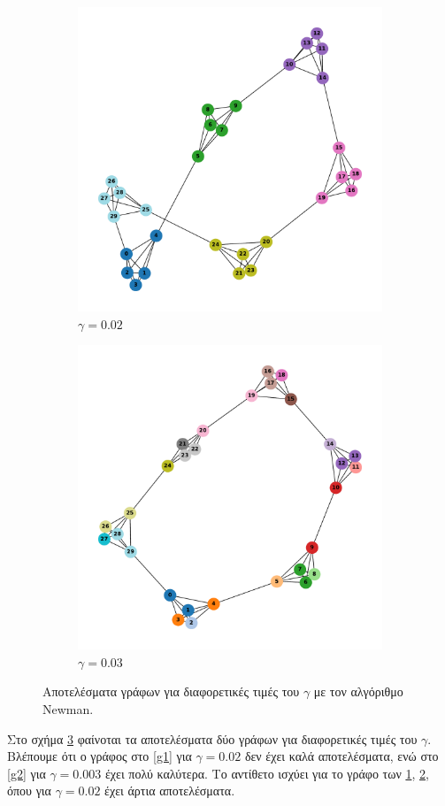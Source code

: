 \documentclass[12pt, letterpaper]{article}
\begin{document}
\begin{figure}
  \begin{subfigure}{0.5\textwidth}
    \centering
    \includegraphics[width=0.6\linewidth]{gammachange6,5gamma=0.02.pdf}
    \caption{$\gamma = 0.02$}
    \label{g3}
  \end{subfigure}
  \begin{subfigure}{0.5\textwidth}
    \centering
    \includegraphics[width=0.6\linewidth]{gammachange6,5gamma=0.04.pdf}
    \caption{$\gamma = 0.03$}
    \label{g4}
  \end{subfigure}


  \caption{Αποτελέσματα γράφων για διαφορετικές τιμές του $\gamma$
  με τον αλγόριθμο \textlatin{Newman}.}
  \label{gamma_tests}
\end{figure}




Στο σχήμα \ref{gamma_tests} φαίνοται τα αποτελέσματα δύο γράφων για διαφορετικές τιμές
του $\gamma$. Βλέπουμε ότι ο γράφος στο \ref{g1} για $\gamma = 0.02$ δεν έχει καλά 
αποτελέσματα, ενώ στο \ref{g2} για $\gamma = 0.003$ έχει πολύ καλύτερα. Το αντίθετο 
ισχύει για το γράφο των \ref{g3}, \ref{g4}, όπου για $\gamma = 0.02$ έχει άρτια αποτελέσματα.
\end{document}
